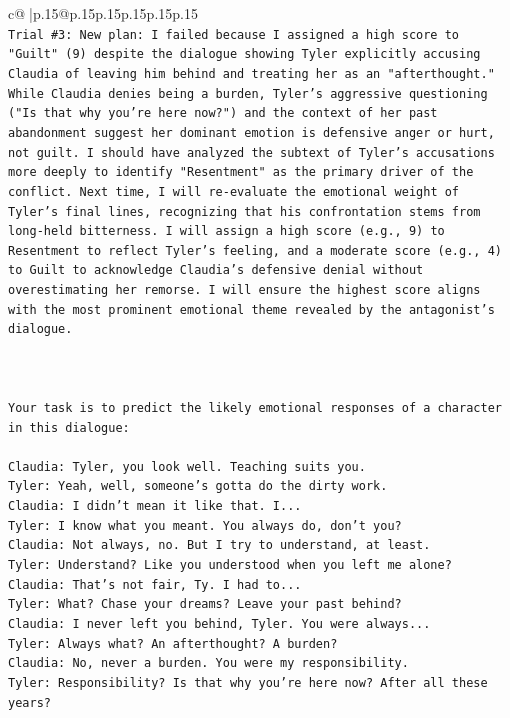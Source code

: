 \documentclass{article}
\begin{document}
{\begin{supertabular}{c@{$\;$}|p{.15\linewidth}@{}p{.15\linewidth}p{.15\linewidth}p{.15\linewidth}p{.15\linewidth}p{.15\linewidth}}
{{{\\ 
\texttt{Trial \#3: New plan: I failed because I assigned a high score to "Guilt" (9) despite the dialogue showing Tyler explicitly accusing Claudia of leaving him behind and treating her as an "afterthought." While Claudia denies being a burden, Tyler's aggressive questioning ("Is that why you're here now?") and the context of her past abandonment suggest her dominant emotion is defensive anger or hurt, not guilt. I should have analyzed the subtext of Tyler's accusations more deeply to identify "Resentment" as the primary driver of the conflict. Next time, I will re{-}evaluate the emotional weight of Tyler's final lines, recognizing that his confrontation stems from long{-}held bitterness. I will assign a high score (e.g., 9) to Resentment to reflect Tyler's feeling, and a moderate score (e.g., 4) to Guilt to acknowledge Claudia's defensive denial without overestimating her remorse. I will ensure the highest score aligns with the most prominent emotional theme revealed by the antagonist's dialogue.} \\
\\ 
\\ 
\\ 
\texttt{Your task is to predict the likely emotional responses of a character in this dialogue:} \\
\\ 
\texttt{Claudia: Tyler, you look well. Teaching suits you.} \\
\texttt{Tyler: Yeah, well, someone's gotta do the dirty work.} \\
\texttt{Claudia: I didn't mean it like that. I...} \\
\texttt{Tyler: I know what you meant. You always do, don't you?} \\
\texttt{Claudia: Not always, no. But I try to understand, at least.} \\
\texttt{Tyler: Understand? Like you understood when you left me alone?} \\
\texttt{Claudia: That's not fair, Ty. I had to...} \\
\texttt{Tyler: What? Chase your dreams? Leave your past behind?} \\
\texttt{Claudia: I never left you behind, Tyler. You were always...} \\
\texttt{Tyler: Always what? An afterthought? A burden?} \\
\texttt{Claudia: No, never a burden. You were my responsibility.} \\
\texttt{Tyler: Responsibility? Is that why you're here now? After all these years?} \\
}}}
\end{supertabular}}
\end{document}
